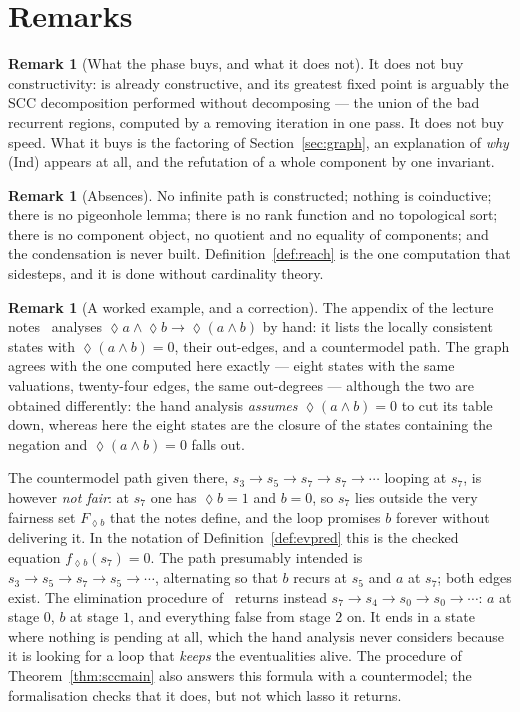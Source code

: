 \documentclass[11pt,a4paper]{article}
\theoremstyle{definition}
\newtheorem{remark}[theorem]{Remark}
\newcommand{\Event}{\mathop{\lozenge}}
\begin{document}
\section{Remarks}

\begin{remark}[What the phase buys, and what it does not]
It does not buy constructivity: \cite{m4} is already constructive, and its
greatest fixed point is arguably the SCC decomposition performed without
decomposing --- the union of the bad recurrent regions, computed by a removing
iteration in one pass.  It does not buy speed.  What it buys is the factoring
of Section~\ref{sec:graph}, an explanation of \emph{why} (Ind) appears at all,
and the refutation of a whole component by one invariant.
\end{remark}

\begin{remark}[Absences]
No infinite path is constructed; nothing is coinductive; there is no pigeonhole
lemma; there is no rank function and no topological sort; there is no component
object, no quotient and no equality of components; and the condensation is
never built.  Definition~\ref{def:reach} is the one computation that
\cite[Rem.~3.2]{m4} sidesteps, and it is done without cardinality theory.
\end{remark}

\begin{remark}[A worked example, and a correction]\label{rem:lecture}
The appendix of the lecture notes~\cite{lec} analyses
$\Event a\wedge\Event b\to\Event(a\wedge b)$ by hand: it lists the locally
consistent states with $\Event(a\wedge b)=0$, their out-edges, and a
countermodel path.  The graph agrees with the one computed here exactly ---
eight states with the same valuations, twenty-four edges, the same out-degrees
--- although the two are obtained differently: the hand analysis \emph{assumes}
$\Event(a\wedge b)=0$ to cut its table down, whereas here the eight states are
the closure of the states containing the negation and $\Event(a\wedge b)=0$
falls out.

The countermodel path given there, $s_3\to s_5\to s_7\to s_7\to\cdots$ looping
at $s_7$, is however \emph{not fair}: at $s_7$ one has $\Event b=1$ and $b=0$,
so $s_7$ lies outside the very fairness set $F_{\Event b}$ that the notes
define, and the loop promises $b$ forever without delivering it.  In the
notation of Definition~\ref{def:evpred} this is the checked equation
$f_{\Event b}(s_7)=0$.  The path presumably intended is
$s_3\to s_5\to s_7\to s_5\to\cdots$, alternating so that $b$ recurs at $s_5$ and
$a$ at $s_7$; both edges exist.  The elimination procedure of~\cite{m4}
returns instead $s_7\to s_4\to s_0\to s_0\to\cdots$: $a$ at stage $0$, $b$ at
stage $1$, and everything false from stage $2$ on.  It ends in a state where
nothing is pending at all, which the hand analysis never considers because it
is looking for a loop that \emph{keeps} the eventualities alive.  The procedure
of Theorem~\ref{thm:sccmain} also answers this formula with a countermodel;
the formalisation checks that it does, but not which lasso it returns.
\end{remark}
\end{document}
